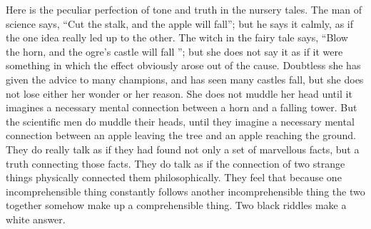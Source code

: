 Here is the peculiar perfection of tone and truth in the nursery tales. The man of science says, “Cut the stalk, and the apple will fall”; but he says it calmly, as if the one idea really led up to the other. The witch in the fairy tale says, “Blow the horn, and the ogre’s castle will fall ”; but she does not say it as if it were something in which the effect obviously arose out of the cause. Doubtless she has given the advice to many champions, and has seen many castles fall, but she does not lose either her wonder or her reason. She does not muddle her head until it imagines a necessary mental connection between a horn and a falling tower. But the scientific men do muddle their heads, until they imagine a necessary mental connection between an apple leaving the tree and an apple reaching the ground. They do really talk as if they had found not only a set of marvellous facts, but a truth connecting those facts. They do talk as if the connection of two strange things physically connected them philosophically. They feel that because one incomprehensible thing constantly follows another incomprehensible thing the two together somehow make up a comprehensible thing. Two black riddles make a white answer.

